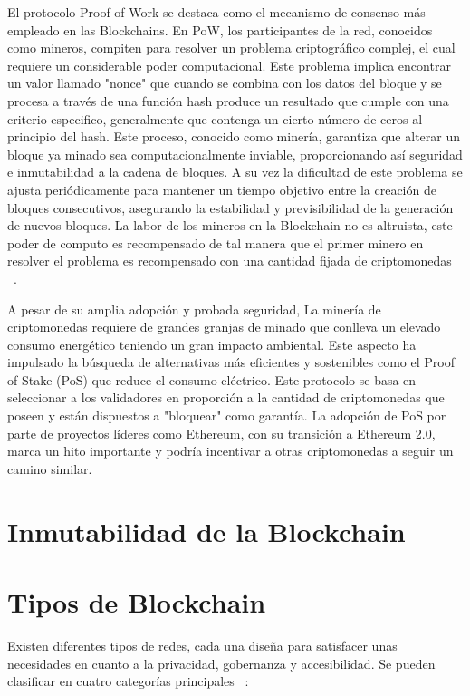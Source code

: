 El protocolo Proof of Work se destaca como el mecanismo de consenso más empleado en las Blockchains. En PoW, los participantes de la red, conocidos como mineros, compiten para resolver un problema criptográfico complej, el cual requiere un considerable poder computacional. Este problema implica encontrar un valor llamado "nonce" que cuando se combina con los datos del bloque y se procesa a través de una función hash produce un resultado que cumple con una criterio especifico, generalmente que contenga un cierto número de ceros al principio del hash.
Este proceso, conocido como minería, garantiza que alterar un bloque ya minado sea computacionalmente inviable, proporcionando así seguridad e inmutabilidad a la cadena de bloques. A su vez la dificultad de este problema se ajusta periódicamente para mantener un tiempo objetivo entre la creación de bloques consecutivos, asegurando la estabilidad y previsibilidad de la generación de nuevos bloques.
La labor de los mineros en la Blockchain no es altruista, este poder de computo es recompensado de tal manera que el primer minero en resolver el problema es recompensado con una cantidad fijada de criptomonedas ~\cite{PoW}.

A pesar de su amplia adopción y probada seguridad, La minería de criptomonedas requiere de grandes granjas de minado que conlleva un elevado consumo energético teniendo un gran impacto ambiental. 
Este aspecto ha impulsado la búsqueda de alternativas más eficientes y sostenibles como el Proof of Stake (PoS) que reduce el consumo eléctrico. Este protocolo se basa en seleccionar a los validadores en proporción a la cantidad de criptomonedas que poseen y están dispuestos a "bloquear" como garantía.
La adopción de PoS por parte de proyectos líderes como Ethereum, con su transición a Ethereum 2.0, marca un hito importante y podría incentivar a otras criptomonedas a seguir un camino similar.


\section{Inmutabilidad de la Blockchain}




\section{Tipos de Blockchain}

Existen diferentes tipos de redes, cada una diseña para satisfacer unas necesidades en cuanto a la privacidad, gobernanza y accesibilidad. 
Se pueden clasificar en cuatro categorías principales ~\cite{introducciónBlockchain}:

